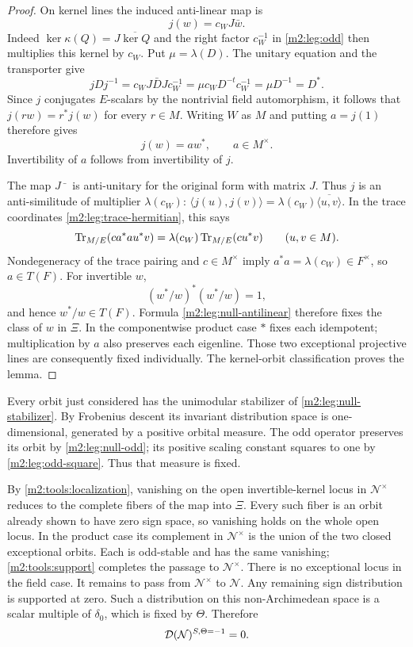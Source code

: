 \begin{proof}
On kernel lines the induced anti-linear map is
\[
 j(w)=c_WJ\bar w.
\]
Indeed $\ker\kappa(Q)=J\overline{\ker Q}$ and the right factor
$c_W^{-1}$ in \eqref{m2:leg:odd} then multiplies this kernel by $c_W$.
Put $\mu=\lambda(D)$. The unitary equation and the transporter give
\[
 jDj^{-1}=c_WJ\bar DJc_W^{-1}
          =\mu c_WD^{-t}c_W^{-1}
          =\mu D^{-1}=D^*.
\]
Since $j$ conjugates $E$-scalars by the nontrivial field automorphism,
it follows that $j(rw)=r^*j(w)$ for every $r\in M$.
Writing $W$ as $M$ and putting $a=j(1)$ therefore gives
\begin{equation}\label{m2:leg:null-antilinear}
 j(w)=aw^*,\qquad a\in M^\times.
\end{equation}
Invertibility of $a$ follows from invertibility of $j$.

The map $J\bar{\phantom w}$ is anti-unitary for the original form
with matrix $J$. Thus $j$ is an anti-similitude of multiplier
$\lambda(c_W)$: $\langle j(u),j(v)\rangle
=\lambda(c_W)\overline{\langle u,v\rangle}$.
In the trace coordinates \eqref{m2:leg:trace-hermitian}, this says
\[
 \operatorname{Tr}_{M/E}(c a^*a u^*v)
       =\lambda(c_W)\operatorname{Tr}_{M/E}(c u^*v)\qquad(u,v\in M).
\]
Nondegeneracy of the trace pairing and $c\in M^\times$ imply
$a^*a=\lambda(c_W)\in F^\times$, so $a\in T(F)$.
For invertible $w$,
\[
 (w^*/w)^*(w^*/w)=1,
\]
and hence $w^*/w\in T(F)$. Formula
\eqref{m2:leg:null-antilinear} therefore fixes the class of $w$ in
$\Xi$. In the componentwise product case $*$ fixes each idempotent;
multiplication by $a$ also preserves each eigenline. Those two
exceptional projective lines are consequently fixed individually.
The kernel-orbit classification proves the lemma.
\end{proof}

Every orbit just considered has the unimodular stabilizer
of \cref{m2:leg:null-stabilizer}. By Frobenius descent its invariant
distribution space is one-dimensional, generated by a positive
orbital measure. The odd operator preserves its orbit by
\cref{m2:leg:null-odd}; its positive scaling constant squares to one
by \eqref{m2:leg:odd-square}. Thus that measure is fixed.

By \cref{m2:tools:localization}, vanishing on the open
invertible-kernel locus in $\mathcal N^\times$ reduces to the complete
fibers of the map into $\Xi$. Every such fiber is an orbit already
shown to have zero sign space, so vanishing holds on the whole open locus. In the product case its
complement in $\mathcal N^\times$ is the union of the two closed
exceptional orbits. Each is odd-stable and has the same vanishing;
\cref{m2:tools:support} completes the passage to
$\mathcal N^\times$. There is no exceptional locus in the field case.
It remains to pass from $\mathcal N^\times$ to $\mathcal N$.
Any remaining sign distribution is supported at zero. Such a
distribution on this non-Archimedean space is a scalar multiple of
$\delta_0$, which is fixed by $\Theta$. Therefore
\begin{equation}\label{m2:leg:null-vanishing}
 \mathcal D(\mathcal N)^{S,\Theta=-1}=0.
\end{equation}


